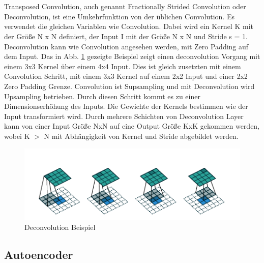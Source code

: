 \documentclass{llncs}
\begin{document}
\\\\
Transposed Convolution, auch genannt Fractionally Strided Convolution oder Deconvolution, ist eine Umkehrfunktion von der üblichen Convolution. Es verwendet die gleichen Variablen wie Convolution. Dabei wird ein Kernel K mit der Größe N x N definiert, der Input I mit der Größe N x N und Stride s = 1. Deconvolution kann wie Convolution angesehen werden, mit  Zero Padding auf dem Input.  Das in Abb. \ref{fig:Bild12} gezeigte Beispiel zeigt einen deconvolution Vorgang mit einem 3x3 Kernel über einem 4x4 Input. Dies ist gleich zusetzten mit einem Convolution Schritt, mit einem 3x3 Kernel auf einem 2x2 Input und einer 2x2 Zero Padding Grenze. Convolution ist Supsampling und mit Deconvolution wird Upsampling betrieben. Durch diesen Schritt kommt es zu einer Dimensionserhöhung des Inputs. Die Gewichte der Kernels bestimmen wie der Input transformiert wird. Durch mehrere Schichten von Deconvolution Layer kann von einer Input Größe NxN auf eine Output Größe KxK gekommen werden, wobei K $>$ N mit Abhängigkeit von Kernel und Stride abgebildet werden\cite{conv}. 

\begin{figure}[htbp] 
	\centering
	\includegraphics[width=1.0\textwidth]{decon.png}
	\caption{Deconvolution Beispiel \protect\cite{conv}}
	\label{fig:Bild12}
\end{figure}
\newpage
\subsection{Autoencoder}\label{sec:autoencoder}
\end{document}
